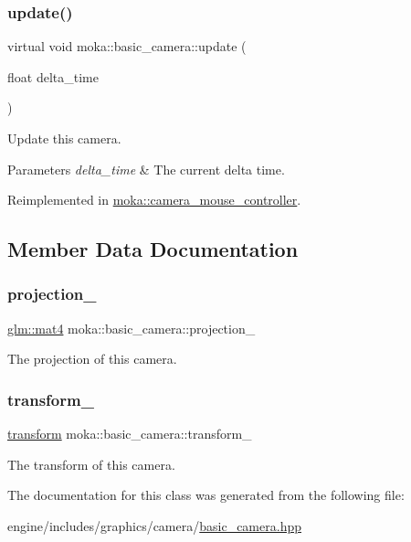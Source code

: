 \subsubsection{\texorpdfstring{update()}{update()}}
{\footnotesize\ttfamily virtual void moka\+::basic\+\_\+camera\+::update (\begin{DoxyParamCaption}\item[{float}]{delta\+\_\+time }\end{DoxyParamCaption})\hspace{0.3cm}{\ttfamily [virtual]}}



Update this camera. 


\begin{DoxyParams}{Parameters}
{\em delta\+\_\+time} & The current delta time. \\
\hline
\end{DoxyParams}


Reimplemented in \mbox{\hyperlink{classmoka_1_1camera__mouse__controller_a088d8d1f491895f394e67253d4ee4a76}{moka\+::camera\+\_\+mouse\+\_\+controller}}.



\subsection{Member Data Documentation}
\mbox{\label{classmoka_1_1basic__camera_a6726e56b0b8b2279c948e5f94a0ace05}} 
\subsubsection{\texorpdfstring{projection\_}{projection\_}}
{\footnotesize\ttfamily \mbox{\hyperlink{namespacemoka_aed2224bc0e5b79e57a8975ded94ee1aaabe14b41eb96410ea28b32bc138d885ae}{glm\+::mat4}} moka\+::basic\+\_\+camera\+::projection\+\_\+\hspace{0.3cm}{\ttfamily [protected]}}

The projection of this camera. \mbox{\label{classmoka_1_1basic__camera_a06bb674f79f4448a3980cb94c88bf0cb}} 
\subsubsection{\texorpdfstring{transform\_}{transform\_}}
{\footnotesize\ttfamily \mbox{\hyperlink{classmoka_1_1transform}{transform}} moka\+::basic\+\_\+camera\+::transform\+\_\+\hspace{0.3cm}{\ttfamily [protected]}}

The transform of this camera. 

The documentation for this class was generated from the following file\+:\begin{DoxyCompactItemize}
\item 
engine/includes/graphics/camera/\mbox{\hyperlink{basic__camera_8hpp}{basic\+\_\+camera.\+hpp}}\end{DoxyCompactItemize}
